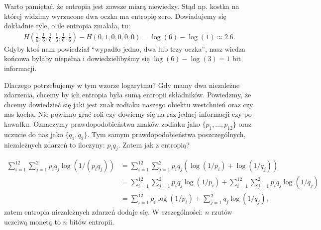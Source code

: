 \documentclass[10pt,a4paper]{article}
\begin{document}
Warto pamiętać, że entropia jest zawsze miarą niewiedzy.
Stąd np. kostka na której widzimy wyrzucone dwa oczka ma entropię zero.
Dowiadujemy się dokładnie tyle, o ile entropia zmalała, tu:
%
\begin{align}
    H(\tfrac{1}{6}, \tfrac{1}{6}, \tfrac{1}{6}, \tfrac{1}{6}, \tfrac{1}{6}, \tfrac{1}{6})
    - H(0, 1, 0, 0, 0, 0) = \log(6) - \log(1)
    \approx 2.6.
\end{align}
%
Gdyby ktoś nam powiedział ``wypadło jedno, dwa lub trzy oczka'', nasz wiedza końcowa byłaby niepełna i dowiedzielibyśmy się $\log(6) - \log(3) = 1 $ bit informacji.


Dlaczego potrzebujemy w tym wzorze logarytmu? 
Gdy mamy dwa niezależne zdarzenia, chcemy by ich entropia była sumą entropii składników.
Powiedzmy, że chcemy dowiedzieć się jaki jest znak zodiaku naszego obiektu westchnień oraz czy nas kocha.
Nie powinno grać roli czy dowiemy się na raz jednej informacji czy po kawałku.
Oznaczymy prawdopodobieństwa znaków zodiaku jako $\{p_1, \ldots, p_{12} \}$ oraz uczucie do nas jako $\{q_1, q_2\}$.
Tym samym prawdopodobieństwa poszczególnych, niezależnych zdarzeń to iloczyny: $p_i q_j$.
Zatem jak z entropią?
%
%

\begin{align}
    \sum_{i=1}^{12} \sum_{j=1}^2 p_i q_j \log(1/(p_i q_j))\label{eq:suma}
    &= \sum_{i=1}^{12} \sum_{j=1}^2 p_i q_j \left( \log(1/p_i) + \log(1/q_j) \right)\\
    &= \sum_{i=1}^{12} \sum_{j=1}^2 p_i q_j \log(1/p_i)
    +\sum_{i=1}^{12} \sum_{j=1}^2 p_i q_j \log(1/q_j)\nonumber\\
    &= \sum_{i=1}^{12} p_i \log(1/p_i)
    + \sum_{j=1}^2 q_j \log(1/q_j),\nonumber
\end{align}
%
zatem entropia niezależnych zdarzeń dodaje się.
W szczególności: $n$ rzutów uczciwą monetą to $n$ bitów entropii.
%
%
\end{document}
